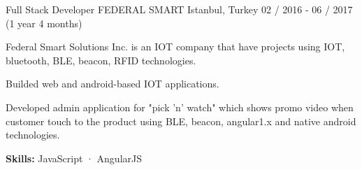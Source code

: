\begin{cventries}
  \cventry
    {Full Stack Developer} %
    {FEDERAL SMART} %
    {Istanbul, Turkey} %
    {02 / 2016 - 06 / 2017 (1 year 4 months)}
    {
      \begin{cvitems} %
        \item {Federal Smart Solutions Inc. is an IOT company that have projects using IOT, bluetooth, BLE, beacon, RFID technologies.}
        \item {Builded web and android-based IOT applications.}
        \item {Developed admin application for "pick 'n' watch" which shows promo video when customer touch to the product using BLE, beacon, angular1.x and native android technologies.}
        \item {\textbf {\textbf {Skills:}} JavaScript · AngularJS}
      \end{cvitems}
    }

\end{cventries}
